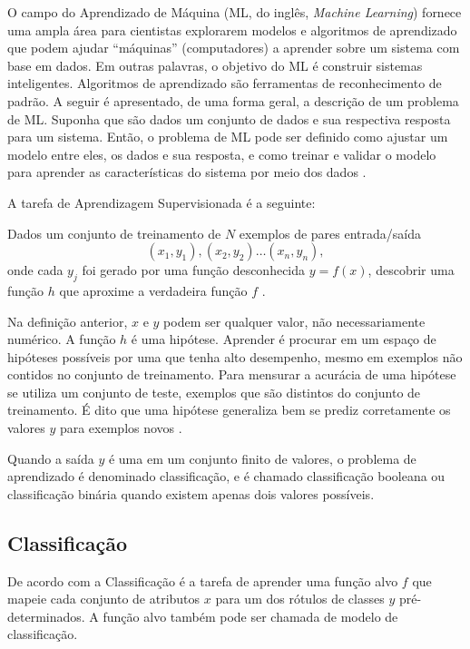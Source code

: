 O campo do Aprendizado de Máquina (ML, do inglês, \textit{Machine Learning})
fornece uma ampla área para cientistas explorarem modelos e algoritmos de
aprendizado que podem ajudar ``máquinas'' (computadores) a aprender sobre um
sistema com base em dados. Em outras palavras, o objetivo do ML é construir
sistemas inteligentes. Algoritmos de aprendizado são ferramentas de
reconhecimento de padrão. A seguir é apresentado, de uma forma geral, a
descrição de um problema de ML. Suponha que são dados um conjunto de dados e sua
respectiva resposta para um sistema. Então, o problema de ML pode ser definido
como ajustar um modelo entre eles, os dados e sua resposta, e como treinar e
validar o modelo para aprender as características do sistema por meio dos dados
\cite{suthaharan2016machine}.

A tarefa de Aprendizagem Supervisionada é a seguinte:

Dados um conjunto de treinamento de \(N\) exemplos de pares entrada/saída
\[ (x_1,y_1),(x_2,y_2)\ldots(x_n,y_n), \]
onde cada \(y_j\) foi gerado por uma função desconhecida \(y = f(x)\), descobrir
uma função \(h\) que aproxime a verdadeira função \(f\)
\cite{russell2011artificial}.

Na definição anterior, \(x\) e \(y\) podem ser qualquer valor, não
necessariamente numérico. A função \(h\) é uma hipótese. Aprender é procurar em
um espaço de hipóteses possíveis por uma que tenha alto desempenho, mesmo em
exemplos não contidos no conjunto de treinamento. Para mensurar a acurácia de
uma hipótese se utiliza um conjunto de teste, exemplos que são distintos do
conjunto de treinamento. É dito que uma hipótese generaliza bem se prediz
corretamente os valores \(y\) para exemplos novos \cite{russell2011artificial}.

Quando a saída \(y\) é uma em um conjunto finito de valores, o problema de
aprendizado é denominado classificação, e é chamado classificação booleana ou
classificação binária quando existem apenas dois valores
possíveis\cite{russell2011artificial}.

\subsection{Classificação}

De acordo com  a Classificação é a tarefa de
aprender uma função alvo \(f\) que mapeie cada conjunto de atributos \(x\) para
um dos rótulos de classes \(y\) pré-determinados. A função alvo também pode ser
chamada de modelo de classificação.


